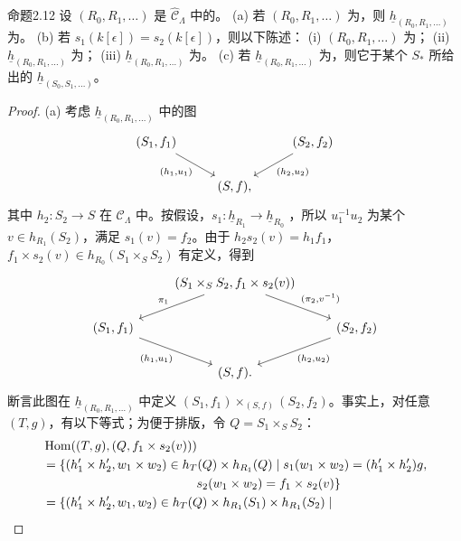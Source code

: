 \begin{SGAresult}{命题}{2.12}
设 $(R_0,R_1,\ldots)$ 是 $\widehat{\mathcal C}_\Lambda$ 中的。
(a) 若 $(R_0,R_1,\ldots)$ 为，则 $\underline h_{(R_0,R_1,\ldots)}$ 为。
(b) 若 $s_1(k[\epsilon])=s_2(k[\epsilon])$，则以下陈述：
(i) $(R_0,R_1,\ldots)$ 为；
(ii) $\underline h_{(R_0,R_1,\ldots)}$ 为；
(iii) $\underline h_{(R_0,R_1,\ldots)}$ 为。
(c) 若 $\underline h_{(R_0,R_1,\ldots)}$ 为，则它于某个 $S_*$ 所给出的 $\underline h_{(S_0,S_1,\ldots)}$。
\end{SGAresult}
\begin{proof}
(a) 考虑 $\underline h_{(R_0,R_1,\ldots)}$ 中的图
\[
\begin{tikzcd}
(S_1,f_1)\arrow[dr,"{(h_1,u_1)}"']&&(S_2,f_2)\arrow[dl,"{(h_2,u_2)}"]\\
&(S,f),&
\end{tikzcd}
\]
其中 $h_2:S_2\to S$ 在 $\mathcal C_\Lambda$ 中。按假设，$s_1:\underline h_{R_1}\to\underline h_{R_0}$ ，所以 $u_1^{-1}u_2$ 为某个 $v\in h_{R_1}(S_2)$，满足 $s_1(v)=f_2$。由于 $h_2s_2(v)=h_1f_1$，$f_1\times s_2(v)\in h_{R_0}(S_1\times_SS_2)$ 有定义，得到
\[
\begin{tikzcd}
&(S_1\times_SS_2,f_1\times s_2(v))\arrow[dl,"\pi_1"']\arrow[dr,"{(\pi_2,v^{-1})}"]&\\
(S_1,f_1)\arrow[dr,"{(h_1,u_1)}"']&&(S_2,f_2)\arrow[dl,"{(h_2,u_2)}"]\\
&(S,f).&
\end{tikzcd}
\]
断言此图在 $\underline h_{(R_0,R_1,\ldots)}$ 中定义 $(S_1,f_1)\times_{(S,f)}(S_2,f_2)$。事实上，对任意 $(T,g)$，有以下等式；为便于排版，令 $Q=S_1\times_SS_2$：
\[
\begin{aligned}
{}&\operatorname{Hom}((T,g),(Q,f_1\times s_2(v)))\\
&=\{(h_1'\times h_2',w_1\times w_2)\in h_T(Q)\times h_{R_1}(Q)\mid
 s_1(w_1\times w_2)=(h_1'\times h_2')g,\\
&\hspace{43mm}s_2(w_1\times w_2)=f_1\times s_2(v)\}\\
&=\{(h_1'\times h_2',w_1,w_2)\in h_T(Q)\times h_{R_1}(S_1)\times h_{R_1}(S_2)\mid

\end{aligned}\]
\end{proof}

